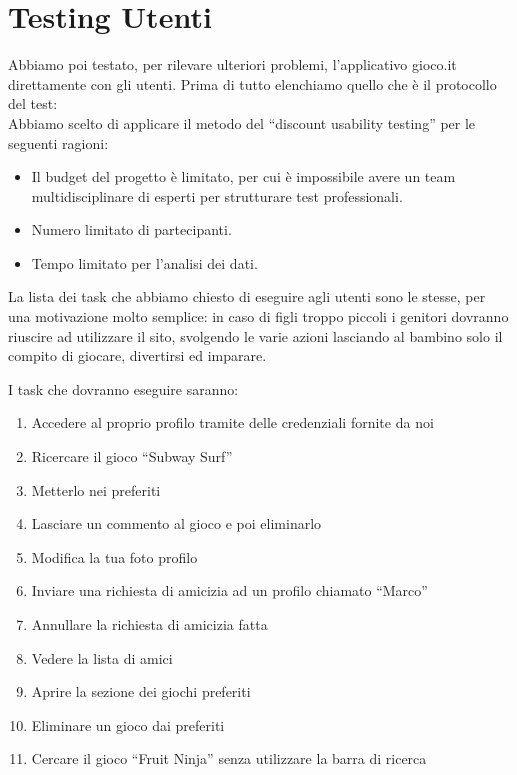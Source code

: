\documentclass[../Report.tex]{subfiles}
\begin{document}
    \section{Testing Utenti}
    Abbiamo poi testato, per rilevare ulteriori problemi, l’applicativo gioco.it direttamente con gli utenti. Prima di tutto elenchiamo quello che è il protocollo del test:\\

    Abbiamo scelto di applicare il metodo del “discount usability testing”  per le seguenti ragioni:
    \begin{itemize}
        \item Il budget del progetto è limitato, per cui è impossibile avere un team multidisciplinare di esperti per strutturare test professionali. 
        \item Numero limitato di partecipanti. 
        \item Tempo limitato per l’analisi dei dati.
    \end{itemize}

    La lista dei task che abbiamo chiesto di eseguire agli utenti sono le stesse, per una motivazione molto semplice: in caso di figli troppo piccoli i genitori dovranno riuscire ad utilizzare il sito, svolgendo le varie azioni lasciando al bambino solo il compito di giocare, divertirsi ed imparare. 

    I task che dovranno eseguire saranno:
    \begin{enumerate}
        \item Accedere al proprio profilo tramite delle credenziali fornite da noi
        \item  Ricercare il gioco “Subway Surf”
        \item Metterlo nei preferiti 
        \item Lasciare un commento al gioco e poi eliminarlo 
        \item Modifica la tua foto profilo
        \item Inviare una richiesta di amicizia ad un profilo chiamato “Marco”
        \item Annullare la richiesta di amicizia fatta
        \item Vedere la lista di amici
        \item Aprire la sezione dei giochi preferiti 
        \item Eliminare un gioco dai preferiti 
        \item Cercare il gioco “Fruit Ninja” senza utilizzare la barra di ricerca
        
    \end{enumerate}
\end{document}
